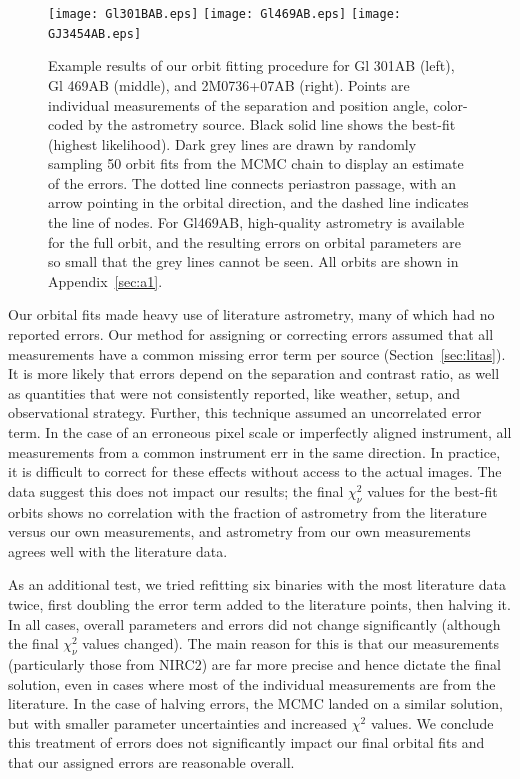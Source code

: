 \documentclass[twocolumn]{aastex62}
\begin{document}
\begin{figure}[htb]
\begin{center}
\texttt{[image: Gl301BAB.eps]}
\texttt{[image: Gl469AB.eps]}
\texttt{[image: GJ3454AB.eps]}
\caption{Example results of our orbit fitting procedure for Gl 301AB (left), Gl 469AB (middle), and 2M0736+07AB (right). Points are individual measurements of the separation and position angle, color-coded by the astrometry source. Black solid line shows the best-fit (highest likelihood). Dark grey lines are drawn by randomly sampling 50 orbit fits from the MCMC chain to display an estimate of the errors. The dotted line connects periastron passage, with an arrow pointing in the orbital direction, and the dashed line indicates the line of nodes. For Gl469AB, high-quality astrometry is available for the full orbit, and the resulting errors on orbital parameters are so small that the grey lines cannot be seen. All orbits are shown in Appendix~\ref{sec:a1}.}
\label{fig:orbits}
\end{center}
\end{figure}


Our orbital fits made heavy use of literature astrometry, many of which had no reported errors. Our method for assigning or correcting errors assumed that all measurements have a common missing error term per source (Section~\ref{sec:litas}). It is more likely that errors depend on the separation and contrast ratio, as well as quantities that were not consistently reported, like weather, setup, and observational strategy. Further, this technique assumed an uncorrelated error term. In the case of an erroneous pixel scale or imperfectly aligned instrument, all measurements from a common instrument err in the same direction. In practice, it is difficult to correct for these effects without access to the actual images. The data suggest this does not impact our results; the final $\chi^2_\nu$ values for the best-fit orbits shows no correlation with the fraction of astrometry from the literature versus our own measurements, and astrometry from our own measurements agrees well with the literature data. 

As an additional test, we tried refitting six binaries with the most literature data twice, first doubling the error term added to the literature points, then halving it. In all cases, overall parameters and errors did not change significantly (although the final $\chi^2_\nu$ values changed). The main reason for this is that our measurements (particularly those from NIRC2) are far more precise and hence dictate the final solution, even in cases where most of the individual measurements are from the literature. In the case of halving errors, the MCMC landed on a similar solution, but with smaller parameter uncertainties and increased $\chi^2$ values. We conclude this treatment of errors does not significantly impact our final orbital fits and that our assigned errors are reasonable overall.
\end{document}
